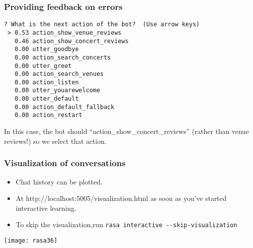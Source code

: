  \begin{frame}[fragile]\frametitle{Providing feedback on errors}
\begin{lstlisting}
? What is the next action of the bot?  (Use arrow keys)
 > 0.53 action_show_venue_reviews
   0.46 action_show_concert_reviews
   0.00 utter_goodbye
   0.00 action_search_concerts
   0.00 utter_greet
   0.00 action_search_venues
   0.00 action_listen
   0.00 utter_youarewelcome
   0.00 utter_default
   0.00 action_default_fallback
   0.00 action_restart
\end{lstlisting}
In this case, the bot should ``action\_show\_concert\_reviews'' (rather than venue reviews!) so we select that action.
\end{frame}

 \begin{frame}[fragile]\frametitle{Visualization of conversations}
\begin{itemize}
\item Chat history can be plotted.
\item At http://localhost:5005/visualization.html as soon as you’ve started interactive learning.
\item To skip the visualization,run \lstinline|rasa interactive --skip-visualization|
\end{itemize}

\begin{center}
\texttt{[image: rasa36]}
\end{center}
\end{frame}
